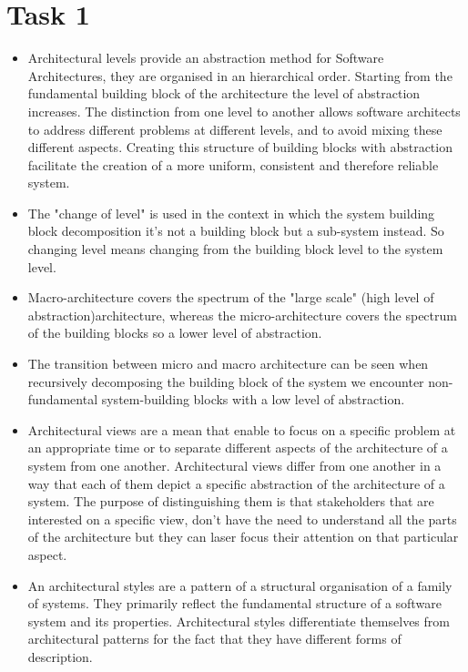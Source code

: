 \chapter{Task 1}
\begin{itemize}
	\item Architectural levels provide an abstraction method for Software Architectures, they are organised in an hierarchical order. Starting from the fundamental building block of the architecture the level of abstraction increases. The distinction from one level to another allows software architects to address different problems at different levels, and to avoid mixing these different aspects. Creating this structure of building blocks with abstraction facilitate the creation of a more uniform, consistent and therefore reliable system.
	\item The "change of level" is used in the context in which the system building block decomposition it's not a building block but a sub-system instead. So changing level means changing from the building block level to the system level.
	\item Macro-architecture covers the spectrum of the "large scale" (high level of abstraction)architecture, whereas the micro-architecture covers the spectrum of the building blocks so a lower level of abstraction.
	\item The transition between micro and macro architecture can be seen when recursively decomposing the building block of the system we encounter non-fundamental system-building blocks with a low level of abstraction.
	\item Architectural views are a mean that enable to focus on a specific problem at an appropriate time or to separate different aspects of the architecture of a system from one another. Architectural views differ from one another in a way that each of them depict a specific abstraction of the architecture of a system. The purpose of distinguishing them is that stakeholders that are interested on a specific view, don't have the need to understand all the parts of the architecture but they can laser focus their attention on that particular aspect.
	\item An architectural styles are a pattern of a structural organisation of a family of systems. They primarily reflect the fundamental structure of a software system and its properties. Architectural styles differentiate themselves from architectural patterns for the fact that they have different forms of description. \cite{Vogel:aa}
\end{itemize}
